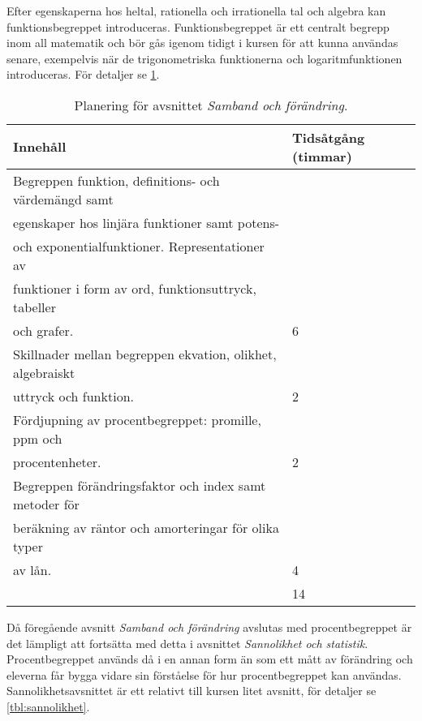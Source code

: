 Efter egenskaperna hos heltal, rationella och irrationella tal och algebra kan
funktionsbegreppet introduceras.
Funktionsbegreppet är ett centralt begrepp inom all matematik och bör gås
igenom tidigt i kursen för att kunna användas senare, exempelvis när
de trigonometriska funktionerna och logaritmfunktionen introduceras.
För detaljer se \cref{tbl:funktioner}.

\begin{table}
  \caption{%
    Planering för avsnittet \emph{Samband och förändring}.
  }\label{tbl:funktioner}
  \begin{tabular}{ll}
    Innehåll & Tidsåtgång (timmar) \\
    \toprule
    Begreppen funktion, definitions- och värdemängd samt\\
      egenskaper hos linjära funktioner samt potens-\\
      och exponentialfunktioner. Representationer av\\
      funktioner i form av ord, funktionsuttryck, tabeller\\
      och grafer.  & 6 \\
    \midrule
    Skillnader mellan begreppen ekvation, olikhet, algebraiskt\\
      uttryck och funktion. & 2 \\
    \midrule
    Fördjupning av procentbegreppet: promille, ppm och\\
      procentenheter. & 2 \\
    \midrule
    Begreppen förändringsfaktor och index samt metoder för\\
      beräkning av räntor och amorteringar för olika typer\\
      av lån. & 4 \\
    \bottomrule
    & 14 \\
  \end{tabular}
\end{table}

Då föregående avsnitt \emph{Samband och förändring} avslutas med
procentbegreppet är det lämpligt att fortsätta med detta i avsnittet
\emph{Sannolikhet och statistik}.
Procentbegreppet används då i en annan form än som ett mått av förändring och
eleverna får bygga vidare sin förståelse för hur procentbegreppet kan användas.
Sannolikhetsavsnittet är ett relativt till kursen litet avsnitt, för detaljer
se \cref{tbl:sannolikhet}.

